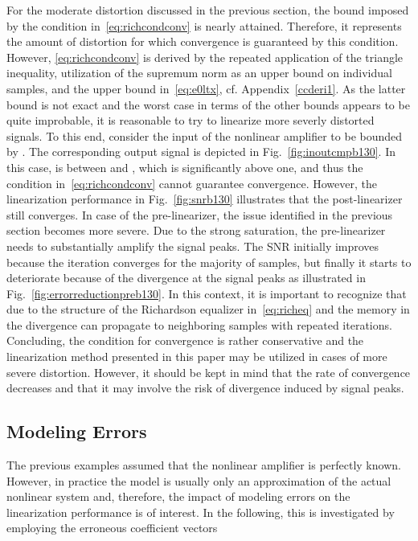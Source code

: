 \documentclass[10pt,twocolumn,twoside]{IEEEtran}
\begin{document}
For the moderate distortion discussed in the previous section, the bound
imposed by the condition in~\eqref{eq:richcondconv} is nearly attained.
Therefore, it represents the amount of distortion for which convergence
is guaranteed by this condition. However, \eqref{eq:richcondconv} is derived
by the repeated application of the triangle inequality, utilization of the
supremum norm as an upper bound on individual samples, and the upper bound
in~\eqref{eq:e0ltx}, cf. Appendix~\ref{ccderi1}. As the latter bound is not
exact and the worst case in terms of the other bounds appears to be quite
improbable, it is reasonable to try to linearize more severly distorted signals.
To this end, consider the input of the nonlinear amplifier to be bounded by .
The corresponding output signal is depicted in Fig.~\ref{fig:inoutcmpb130}.
In this case,  is between  and , which is
significantly above one, and thus the condition in~\eqref{eq:richcondconv}
cannot guarantee convergence.
However, the linearization performance in Fig.~\ref{fig:snrb130} illustrates that
the post-linearizer still converges. In case of the pre-linearizer, the issue identified
in the previous section becomes more severe. Due to the strong saturation, the pre-linearizer
needs to substantially amplify the signal peaks. The SNR initially improves because the
iteration converges for the majority of samples, but finally it starts to deteriorate
because of the divergence at the signal peaks as illustrated in Fig.~\ref{fig:errorreductionpreb130}.
In this context, it is important to recognize that due to the structure of the Richardson
equalizer in~\eqref{eq:richeq} and the memory in  the divergence can propagate to
neighboring samples with repeated iterations.
Concluding, the condition for convergence is rather conservative and the linearization
method presented in this paper may be utilized in cases of more severe distortion. However,
it should be kept in mind that the rate of convergence decreases and that
it may involve the risk of divergence induced by signal peaks.


\subsection{Modeling Errors}

The previous examples assumed that the nonlinear amplifier is perfectly
known. However, in practice the model is usually only an
approximation of the actual nonlinear system and, therefore, the impact of
modeling errors on the linearization performance is of interest.
In the following, this is investigated by employing the erroneous coefficient vectors
\end{document}
